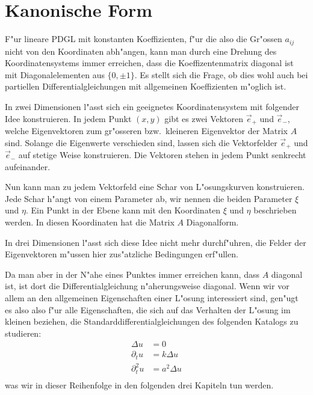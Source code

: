 \section{Kanonische Form}
F"ur lineare PDGL mit konstanten Koeffizienten, f"ur die also die Gr"ossen
$a_{ij}$ nicht von den Koordinaten abh"angen, kann man durch eine Drehung
des Koordinatensystems immer erreichen, dass die Koeffizentenmatrix diagonal
ist mit Diagonalelementen aus $\{0,\pm1\}$. Es stellt sich die Frage, ob
dies wohl auch bei partiellen Differentialgleichungen mit allgemeinen
Koeffizienten m"oglich ist.

In zwei Dimensionen l"asst sich ein geeignetes Koordinatensystem mit folgender
Idee konstruieren. 
In jedem Punkt $(x,y)$ gibt es zwei Vektoren $\vec e_+$ und
$\vec e_-$, welche Eigenvektoren zum gr"osseren bzw.~kleineren Eigenvektor
der Matrix $A$ sind. Solange die Eigenwerte verschieden sind, lassen sich
die Vektorfelder $\vec e_+$ und $\vec e_-$ auf stetige Weise konstruieren.
Die Vektoren stehen in jedem Punkt senkrecht aufeinander.

Nun kann man zu jedem Vektorfeld eine Schar von L"osungskurven
konstruieren. Jede Schar h"angt von einem Parameter ab, wir nennen die
beiden Parameter $\xi$ und $\eta$. Ein Punkt in der Ebene kann mit
den Koordinaten $\xi$ und $\eta$ beschrieben werden.
In diesen Koordinaten hat die Matrix $A$ Diagonalform.

In drei Dimensionen l"asst sich diese Idee nicht mehr durchf"uhren,
die Felder der Eigenvektoren m"ussen hier zus"atzliche Bedingungen
erf"ullen.

Da man aber in der N"ahe eines Punktes immer erreichen kann, dass $A$ diagonal
ist, ist dort die Differentialgleichung n"aherungsweise diagonal.
Wenn wir vor allem an den allgemeinen Eigenschaften einer L"osung interessiert
sind, gen"ugt es also
also f"ur alle Eigenschaften, die sich auf das Verhalten der L"osung im kleinen
beziehen, die Standarddifferentialgleichungen des folgenden Katalogs
zu studieren:
\begin{align*}
\Delta u&=0\\
\partial_tu&=k\Delta u\\
\partial_t^2u&=a^2\Delta u\\
\end{align*}
was wir in dieser Reihenfolge in den folgenden drei Kapiteln tun
werden.

